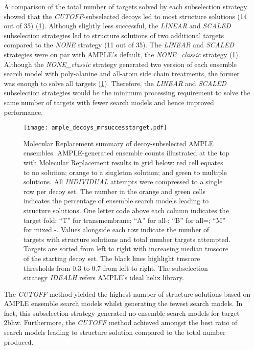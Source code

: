 A comparison of the total number of targets solved by each subselection strategy showed that the \textit{CUTOFF}-subselected decoys led to most structure solutions (14 out of 35) (\cref{fig:ample_decoys_mrsuccesstarget}). Although slightly less successful, the \textit{LINEAR} and \textit{SCALED} subselection strategies led to structure solutions of two additional targets compared to the \textit{NONE} strategy (11 out of 35). The \textit{LINEAR} and \textit{SCALED} strategies were on par with AMPLE's default, the \textit{NONE\_classic} strategy (\cref{fig:ample_decoys_mrsuccesstarget}). Although the \textit{NONE\_classic} strategy generated two version of each ensemble search model with poly-alanine and all-atom side chain treatments, the former was enough to solve all targets (\cref{fig:ample_decoys_mrsuccesstarget}). Therefore, the \textit{LINEAR} and \textit{SCALED} subselection strategies would be the minimum processing requirement to solve the same number of targets with fewer search models and hence improved performance.

\begin{figure}[H]
    \centering
    \texttt{[image: ample\_decoys\_mrsuccesstarget.pdf]}
    \caption[Molecular Replacement summary of decoy-subselected ensembles]{Molecular Replacement summary of decoy-subselected AMPLE ensembles. AMPLE-generated ensemble counts illustrated at the top with Molecular Replacement results in grid below: red cell equates to no solution; orange to a singleton solution; and green to multiple solutions. All \textit{INDIVIDUAL} attempts were compressed to a single row per decoy set. The number in the orange and green cells indicates the percentage of ensemble search models leading to structure solutions. One letter code above each column indicates the target fold: ``T'' for transmembrane; ``A'' for all-\textalpha; ``B'' for all=\textbeta; ``M'' for mixed \textalpha-\textbeta. Values alongside each row indicate the number of targets with structure solutions and total number targets attempted. Targets are sorted from left to right with increasing median \gls{tmscore} of the starting decoy set. The black lines highlight \gls{tmscore} thresholds from 0.3 to 0.7 from left to right. The subselection strategy \textit{IDEALH} refers AMPLE's ideal helix library.}
    \label{fig:ample_decoys_mrsuccesstarget}
\end{figure}

The \textit{CUTOFF} method yielded the highest number of structure solutions based on AMPLE ensemble search models whilst generating the fewest search models. In fact, this subselection strategy generated no ensemble search models for target 2bhw. Furthermore, the \textit{CUTOFF} method achieved amongst the best ratio of search models leading to structure solution compared to the total number produced. 

